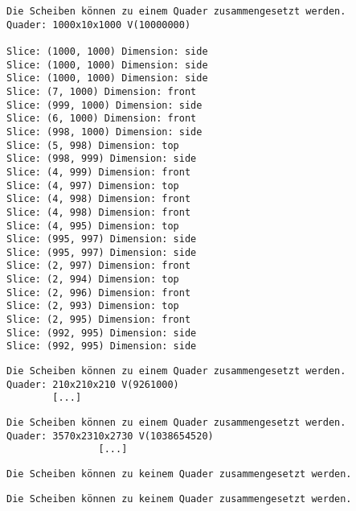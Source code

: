 \documentclass[a4paper,10pt,ngerman]{scrartcl}
\begin{document}
    \begin{lstlisting}[frame=single, title=Programmausgabe kaese3.txt, breaklines=true,label={lst:lstlisting2}]
Die Scheiben können zu einem Quader zusammengesetzt werden.
Quader: 1000x10x1000 V(10000000)

Slice: (1000, 1000) Dimension: side
Slice: (1000, 1000) Dimension: side
Slice: (1000, 1000) Dimension: side
Slice: (7, 1000) Dimension: front
Slice: (999, 1000) Dimension: side
Slice: (6, 1000) Dimension: front
Slice: (998, 1000) Dimension: side
Slice: (5, 998) Dimension: top
Slice: (998, 999) Dimension: side
Slice: (4, 999) Dimension: front
Slice: (4, 997) Dimension: top
Slice: (4, 998) Dimension: front
Slice: (4, 998) Dimension: front
Slice: (4, 995) Dimension: top
Slice: (995, 997) Dimension: side
Slice: (995, 997) Dimension: side
Slice: (2, 997) Dimension: front
Slice: (2, 994) Dimension: top
Slice: (2, 996) Dimension: front
Slice: (2, 993) Dimension: top
Slice: (2, 995) Dimension: front
Slice: (992, 995) Dimension: side
Slice: (992, 995) Dimension: side
    \end{lstlisting}

    \begin{lstlisting}[frame=single, title=Ausschnitt der Programmausgabe kaese4.txt, breaklines=true,label={lst:lstlisting2}]
    Die Scheiben können zu einem Quader zusammengesetzt werden.
Quader: 210x210x210 V(9261000)
        [...]
    \end{lstlisting}

    \begin{lstlisting}[frame=single, title=Ausschnitt der Programmausgabe kaese5.txt, breaklines=true,label={lst:lstlisting2}]
    Die Scheiben können zu einem Quader zusammengesetzt werden.
Quader: 3570x2310x2730 V(1038654520)
                [...]
    \end{lstlisting}

    \begin{lstlisting}[frame=single, title=Programmausgabe kaese6.txt, breaklines=true,label={lst:lstlisting2}]
    Die Scheiben können zu keinem Quader zusammengesetzt werden.
    \end{lstlisting}

    \begin{lstlisting}[frame=single, title=Programmausgabe kaese7.txt, breaklines=true,label={lst:lstlisting2}]
    Die Scheiben können zu keinem Quader zusammengesetzt werden.
    \end{lstlisting}


    \newpage
\end{document}
